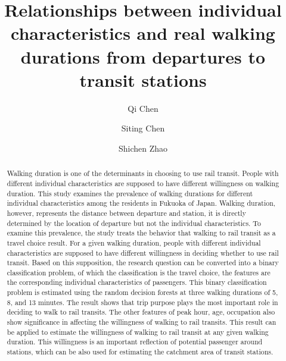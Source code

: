 \documentclass[Journal,letterpaper]{ascelike-new}
\begin{document}
\title{Relationships between individual characteristics and real walking durations from departures to transit stations}
%
\author[1]{Qi Chen}
\author[2]{Siting Chen}
\author[3]{Shichen Zhao}
%
%
\maketitle

\begin{abstract}
Walking duration is one of the determinants in choosing to use rail transit. People with different individual characteristics are supposed to have different willingness on walking duration. 
This study examines the prevalence of walking durations for different individual characteristics among the residents in Fukuoka of Japan. Walking duration, however, represents the distance between departure and station, it is directly determined by the location of departure but not the individual characteristics. 
To examine this prevalence, the study treats the behavior that walking to rail transit as a travel choice result. For a given walking duration, people with different individual characteristics are supposed to have different willingness in deciding whether to use rail transit. Based on this supposition, the research question can be converted into a binary classification problem, of which the classification is the travel choice, the features are the corresponding individual characteristics of passengers. This binary classification problem is estimated using the random decision forests at three walking durations of 5, 8, and 13 minutes.
The result shows that trip purpose plays the most important role in deciding to walk to rail transits. The other features of peak hour, age, occupation also show significance in affecting the willingness of walking to rail transits. 
This result can be applied to estimate the willingness of walking to rail transit at any given walking duration. This willingness is an important reflection of potential passenger around stations, which can be also used for estimating the catchment area of transit stations.
\end{abstract}
\end{document}
